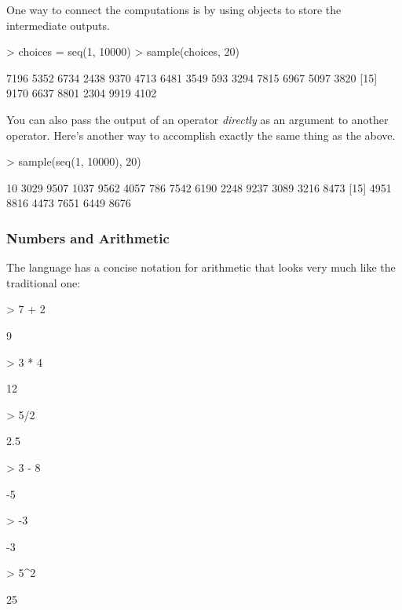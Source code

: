 One way to connect the computations is by using objects to store the
intermediate outputs.   
\begin{Schunk}
\begin{Sinput}
> choices = seq(1, 10000)
> sample(choices, 20)
\end{Sinput}
\begin{Soutput}
 [1] 7196 5352 6734 2438 9370 4713 6481 3549  593 3294 7815 6967 5097 3820
[15] 9170 6637 8801 2304 9919 4102
\end{Soutput}
\end{Schunk}

You can also pass the output of an operator {\em directly} as an
argument to another operator.  Here's another way to accomplish
exactly the same thing as the above.
\begin{Schunk}
\begin{Sinput}
> sample(seq(1, 10000), 20)
\end{Sinput}
\begin{Soutput}
 [1]   10 3029 9507 1037 9562 4057  786 7542 6190 2248 9237 3089 3216 8473
[15] 4951 8816 4473 7651 6449 8676
\end{Soutput}
\end{Schunk}

\subsubsection{Numbers and Arithmetic}

The language has a concise notation for arithmetic that looks very
much like the traditional one:
\begin{Schunk}
\begin{Sinput}
> 7 + 2
\end{Sinput}
\begin{Soutput}
[1] 9
\end{Soutput}
\begin{Sinput}
> 3 * 4
\end{Sinput}
\begin{Soutput}
[1] 12
\end{Soutput}
\begin{Sinput}
> 5/2
\end{Sinput}
\begin{Soutput}
[1] 2.5
\end{Soutput}
\begin{Sinput}
> 3 - 8
\end{Sinput}
\begin{Soutput}
[1] -5
\end{Soutput}
\begin{Sinput}
> -3
\end{Sinput}
\begin{Soutput}
[1] -3
\end{Soutput}
\begin{Sinput}
> 5^2
\end{Sinput}
\begin{Soutput}
[1] 25
\end{Soutput}
\end{Schunk}

